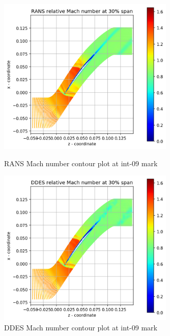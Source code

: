 \begin{figure}[ht]
  \centering
%  

  \includegraphics[width=0.75\textwidth]{Pictures/rans-mach-int-09.png}
  \caption{RANS Mach number contour plot at int-09 mark} \label{int-09-rans-mach}
  
   \vspace*{\floatsep}%
   
  \includegraphics[width=0.75\textwidth]{Pictures/ddes-mach-int-09.png}
  \caption{DDES Mach number contour plot at int-09 mark} \label{int-09-ddes-mach}
\end{figure}

